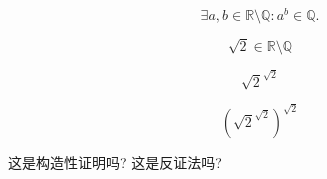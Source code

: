 
\begin{frame}{}
  \begin{theorem}
    \[
      \exists a, b \in \mathbb{R} \setminus \mathbb{Q}: a^{b} \in \mathbb{Q}.
    \]
  \end{theorem}

  \pause
  \[
      \sqrt{2} \in \mathbb{R} \setminus \mathbb{Q}
  \]

  \pause
  \[
      \sqrt{2}^{\sqrt{2}}
  \]

  \pause
  \[
      (\sqrt{2}^{\sqrt{2}})^{\sqrt{2}}
  \]

  \vspace{0.50cm}
  \pause
  \centerline{ 这是构造性证明吗? \pause 这是反证法吗?}
\end{frame}
